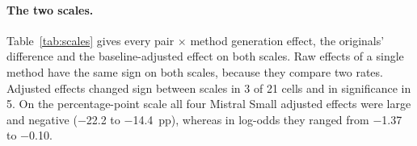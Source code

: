 \paragraph{The two scales.} Table~\ref{tab:scales} gives every pair $\times$
method generation effect, the originals' difference and the baseline-adjusted
effect on both scales. Raw effects of a single method have the same sign on
both scales, because they compare two rates. Adjusted effects changed sign
between scales in 3 of 21 cells and in significance in 5. On the percentage-point
scale all four Mistral Small adjusted effects were large and negative
($-$22.2 to $-$14.4~pp), whereas in log-odds they ranged from $-$1.37 to
$-$0.10.

